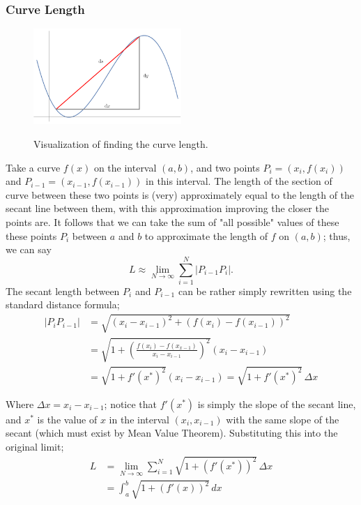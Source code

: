 \documentclass[12pt]{article}
\begin{document}
\subsubsection{Curve Length}

\begin{figure}[!ht]
    \centering
    \includegraphics[width=0.5\textwidth]{misc/curvelength.png}
    \label{fig:curve_length}
    \caption{Visualization of finding the curve length.}
\end{figure}
Take a curve $f(x)$ on the interval $(a,b)$, and two points $P_i = (x_i, f(x_i))$ and $P_{i-1} = (x_{i-1}, f(x_{i-1}))$ in this interval. The length of the section of curve between these two points is (very) approximately equal to the length of the secant line between them, with this approximation improving the closer the points are. It follows that we can take the sum of "all possible" values of these these points $P_i$ between $a$ and $b$ to approximate the length of $f$ on $(a,b)$; thus, we can say \[L \approx \lim_{N \to \infty} \sum_{i=1}^N |P_{i-1}P_{i}|.\] The secant length between $P_i$ and $P_{i-1}$ can be rather simply rewritten using the standard distance formula; \begin{align*}
    |P_i P_{i-1}| &= \sqrt{(x_i- x_{i-1})^2 + (f(x_i) - f(x_{i-1}))^2}\\
    &= \sqrt{1 + (\frac{f(x_i) - f(x_{x-1})}{x_i - x_{i-1}})^2} (x_i - x_{i-1})\\
    &= \sqrt{1 + f'(x^*)^2} (x_i - x_{i-1}) = \sqrt{1 + f'(x^*)^2}\, \Delta x
\end{align*}

Where $\Delta x = x_i - x_{i-1}$; notice that $f'(x^*)$ is simply the slope of the secant line, and $x^*$ is the value of $x$ in the interval $(x_i, x_{i-1})$ with the same slope of the secant (which must exist by Mean Value Theorem). Substituting this into the original limit; \begin{align*}L &= \lim_{N \to \infty} \sum_{i =1}^N \sqrt{1 + (f'(x^*))^2} \,\Delta x\\
    &= \int_{a}^{b} \sqrt{1 + (f'(x))^2} \,dx
\end{align*}
\end{document}

